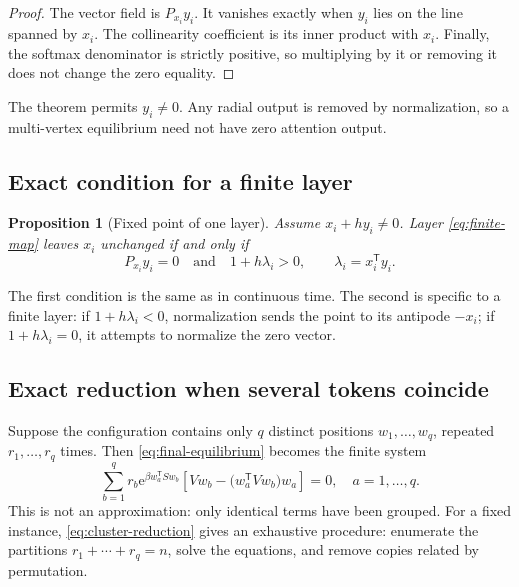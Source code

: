 \documentclass[11pt,a4paper]{article}
\newtheorem{proposition}[theorem]{Proposition}
\theoremstyle{definition}
\newcommand{\e}{\mathrm e}
\newcommand{\T}{\mathsf T}
\begin{document}
\begin{proof}
The vector field is $P_{x_i}y_i$. It vanishes exactly when $y_i$ lies on the line
spanned by $x_i$. The collinearity coefficient is its inner product with $x_i$.
Finally, the softmax denominator is strictly positive, so multiplying by it or
removing it does not change the zero equality.
\end{proof}

The theorem permits $y_i\ne0$. Any radial output is removed by normalization, so a
multi-vertex equilibrium need not have zero attention output.

\subsection{Exact condition for a finite layer}

\begin{proposition}[Fixed point of one layer]
Assume $x_i+h y_i\neq0$. Layer \eqref{eq:finite-map} leaves $x_i$ unchanged if and only if
\begin{equation}
 P_{x_i}y_i=0
 \quad\text{and}\quad
 1+h\lambda_i>0,
 \qquad \lambda_i=x_i^{\T}y_i.                             \label{eq:finite-fixed}
\end{equation}
\end{proposition}

The first condition is the same as in continuous time. The second is specific to a
finite layer: if $1+h\lambda_i<0$, normalization sends the point to its antipode
$-x_i$; if $1+h\lambda_i=0$, it attempts to normalize the zero vector.

\subsection{Exact reduction when several tokens coincide}

Suppose the configuration contains only $q$ distinct positions
$w_1,\ldots,w_q$, repeated $r_1,\ldots,r_q$ times. Then
\eqref{eq:final-equilibrium} becomes the finite system
\begin{equation}
 \boxed{\quad
 \sum_{b=1}^q r_b\e^{\beta w_a^{\T}Sw_b}
 \left[Vw_b-\bigl(w_a^{\T}Vw_b\bigr)w_a\right]=0,
 \quad a=1,\ldots,q.\quad}                                \label{eq:cluster-reduction}
\end{equation}
This is not an approximation: only identical terms have been grouped. For a fixed
instance, \eqref{eq:cluster-reduction} gives an exhaustive procedure: enumerate the
partitions $r_1+\cdots+r_q=n$, solve the equations, and remove copies related by
permutation.
\end{document}
